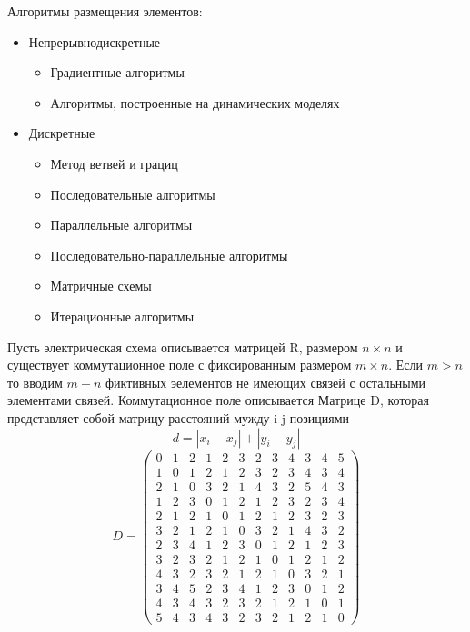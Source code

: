 \documentclass{article}
\begin{document}
	Алгоритмы размещения элементов:
	\begin{itemize}
		\item Непрерывнодискретные
		\begin{itemize}
			\item Градиентные алгоритмы
			\item Алгоритмы, построенные на динамических моделях
		\end{itemize}
		\item Дискретные
		\begin{itemize}
			\item Метод ветвей и грациц
			\item Последовательные алгоритмы
			\item Параллельные алгоритмы
			\item Последовательно-параллельные алгоритмы
			\item Матричные схемы
			\item Итерационные алгоритмы
		\end{itemize}
	\end{itemize}

	Пусть электрическая схема описывается матрицей R, размером $n \times n$ и существует коммутационное поле с фиксированным размером $m \times n$. Если $m > n$ то вводим $m - n$ фиктивных эелементов не имеющих связей с остальными элементами связей. Коммутационное поле описывается Матрице D, которая представляет собой матрицу расстояний мужду i j позициями
	$$
	d = |x_i - x_j| + |y_i - y_j|
	$$
	$$
	D = 
	\begin{pmatrix}
		0 & 1 & 2 & 1 & 2 & 3 & 2 & 3 & 4 & 3 & 4 & 5\\
		1 & 0 & 1 & 2 & 1 & 2 & 3 & 2 & 3 & 4 & 3 & 4\\
		2 & 1 & 0 & 3 & 2 & 1 & 4 & 3 & 2 & 5 & 4 & 3\\
		1 & 2 & 3 & 0 & 1 & 2 & 1 & 2 & 3 & 2 & 3 & 4\\
		2 & 1 & 2 & 1 & 0 & 1 & 2 & 1 & 2 & 3 & 2 & 3\\
		3 & 2 & 1 & 2 & 1 & 0 & 3 & 2 & 1 & 4 & 3 & 2\\
		2 & 3 & 4 & 1 & 2 & 3 & 0 & 1 & 2 & 1 & 2 & 3\\
		3 & 2 & 3 & 2 & 1 & 2 & 1 & 0 & 1 & 2 & 1 & 2\\
		4 & 3 & 2 & 3 & 2 & 1 & 2 & 1 & 0 & 3 & 2 & 1\\
		3 & 4 & 5 & 2 & 3 & 4 & 1 & 2 & 3 & 0 & 1 & 2\\
		4 & 3 & 4 & 3 & 2 & 3 & 2 & 1 & 2 & 1 & 0 & 1\\
		5 & 4 & 3 & 4 & 3 & 2 & 3 & 2 & 1 & 2 & 1 & 0
	\end{pmatrix}
	$$
\end{document}
